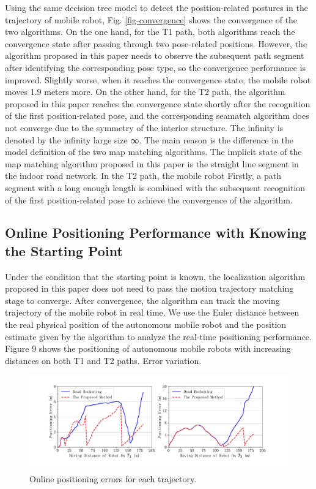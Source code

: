 \documentclass{llncs}
\begin{document}
Using the same decision tree model to detect the position-related postures in the trajectory of mobile robot, Fig. \ref{fig-convergence} shows the convergence of the two algorithms. On the one hand, for the T1 path, both algorithms reach the convergence state after passing through two pose-related positions. However, the algorithm proposed in this paper needs to observe the subsequent path segment after identifying the corresponding pose type, so the convergence performance is improved. Slightly worse, when it reaches the convergence state, the mobile robot moves 1.9 meters more. On the other hand, for the T2 path, the algorithm proposed in this paper reaches the convergence state shortly after the recognition of the first position-related pose, and the corresponding seamatch algorithm does not converge due to the symmetry of the interior structure. The infinity is denoted by the infinity large size ∞. The main reason is the difference in the model definition of the two map matching algorithms. The implicit state of the map matching algorithm proposed in this paper is the straight line segment in the indoor road network. In the T2 path, the mobile robot Firstly, a path segment with a long enough length is combined with the subsequent recognition of the first position-related pose to achieve the convergence of the algorithm.


\subsection{Online Positioning Performance with Knowing the Starting Point}

Under the condition that the starting point is known, the localization algorithm proposed in this paper does not need to pass the motion trajectory matching stage to converge. After convergence, the algorithm can track the moving trajectory of the mobile robot in real time. We use the Euler distance between the real physical position of the autonomous mobile robot and the position estimate given by the algorithm to analyze the real-time positioning performance. Figure 9 shows the positioning of autonomous mobile robots with increasing distances on both T1 and T2 paths. Error variation.

\begin{figure}[!htbp]
	\centering
	\includegraphics[width=5.076in]{RobotMatch-OnlineError}
	\caption{Online positioning errors for each trajectory.}
	\label{fig-online}
\end{figure}
\end{document}
